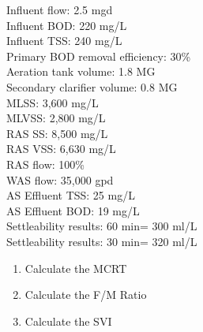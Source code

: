 \documentclass{article}
\begin{document}
\begin{enumerate}
Influent flow: 2.5 mgd\\
Influent BOD: 220 mg/L\\
Influent TSS: 240 mg/L\\
Primary BOD removal efficiency: 30\%\\
Aeration tank volume: 1.8 MG\\
Secondary clarifier volume: 0.8 MG\\
MLSS: 3,600 mg/L\\
MLVSS: 2,800 mg/L\\
RAS SS: 8,500 mg/L\\
RAS VSS: 6,630 mg/L\\
RAS flow: 100\%\\
WAS flow: 35,000 gpd\\
AS Effluent TSS: 25 mg/L\\
AS Effluent BOD: 19 mg/L\\
Settleability results: 60 min= 300 ml/L\\
Settleability results: 30 min= 320 ml/L\\

\begin{enumerate}
\item Calculate the MCRT
\item Calculate the F/M Ratio
\item Calculate the SVI
\end{enumerate}


\end{enumerate}
\end{document}

